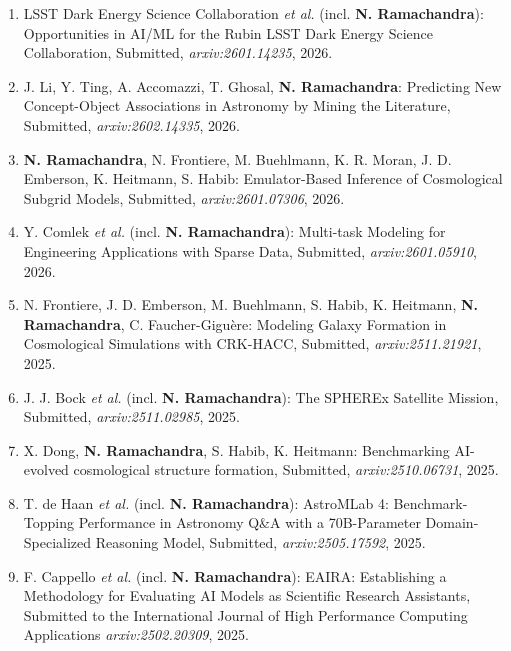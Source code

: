 \documentclass[letterpaper]{article}
\begin{document}
\begin{enumerate}

\item LSST Dark Energy Science Collaboration {\it et al.} (incl. \textbf{N. Ramachandra}): Opportunities in AI/ML for the Rubin LSST Dark Energy Science Collaboration, Submitted, {\it arxiv:2601.14235}, 2026.

\item J. Li, Y. Ting, A. Accomazzi, T. Ghosal, \textbf{N. Ramachandra}: Predicting New Concept-Object Associations in Astronomy by Mining the Literature, Submitted, {\it arxiv:2602.14335}, 2026.

\item \textbf{N. Ramachandra}, N. Frontiere, M. Buehlmann, K. R. Moran, J. D. Emberson, K. Heitmann, S. Habib: Emulator-Based Inference of Cosmological Subgrid Models, Submitted, {\it arxiv:2601.07306}, 2026.

\item Y. Comlek {\it et al.} (incl. \textbf{N. Ramachandra}): Multi-task Modeling for Engineering Applications with Sparse Data, Submitted, {\it arxiv:2601.05910}, 2026.

\item N. Frontiere, J. D. Emberson, M. Buehlmann, S. Habib, K. Heitmann, \textbf{N. Ramachandra}, C. Faucher-Gigu\`ere: Modeling Galaxy Formation in Cosmological Simulations with CRK-HACC, Submitted, {\it arxiv:2511.21921}, 2025.

\item J. J. Bock {\it et al.} (incl. \textbf{N. Ramachandra}): The SPHEREx Satellite Mission, Submitted, {\it arxiv:2511.02985}, 2025.

\item X. Dong, \textbf{N. Ramachandra}, S. Habib, K. Heitmann: Benchmarking AI-evolved cosmological structure formation, Submitted, {\it arxiv:2510.06731}, 2025.

\item T. de Haan {\it et al.} (incl. \textbf{N. Ramachandra}): AstroMLab 4: Benchmark-Topping Performance in Astronomy Q\&A with a 70B-Parameter Domain-Specialized Reasoning Model, Submitted, {\it arxiv:2505.17592}, 2025.

\item F. Cappello {\it et al.} (incl. \textbf{N. Ramachandra}): EAIRA: Establishing a Methodology for Evaluating AI Models as Scientific Research Assistants, Submitted to the International Journal of High Performance Computing Applications {\it arxiv:2502.20309}, 2025. 



\end{enumerate}
\end{document}
